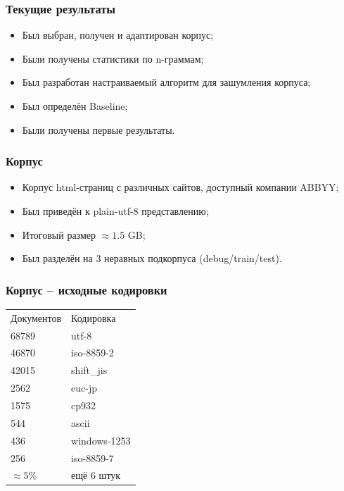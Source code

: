 \documentclass[14pt]{beamer}
\begin{document}
\begin{frame}
\frametitle{Текущие результаты}
\begin{itemize}
    \item Был выбран, получен и адаптирован корпус;
    \item Были получены статистики по n-граммам;
    \item Был разработан настраиваемый алгоритм для зашумления корпуса;
    \item Был определён Baseline;
    \item Были получены первые результаты.
\end{itemize}
\end{frame}

\begin{frame}
\frametitle{Корпус}
\begin{itemize}
    \item Корпус html-страниц с различных сайтов, доступный компании ABBYY;
    \item Был приведён к plain-utf-8 представлению;
    \item Итоговый размер $\approx 1.5$ GB;
    \item Был разделён на 3 неравных подкорпуса (debug/train/test).
\end{itemize}
\end{frame}

\begin{frame}
\frametitle{Корпус -- исходные кодировки}
\begin{center}
\begin{tabular}{ll}
Документов & Кодировка \\
68789 & utf-8 \\
46870 & iso-8859-2 \\
42015 & shift\_jis \\
2562 & euc-jp \\
1575 & cp932 \\
544 & ascii \\
436 & windows-1253 \\
256 & iso-8859-7 \\
$\approx 5\%$ & ещё 6 штук \\
\end{tabular}
\end{center}
\end{frame}
\end{document}
